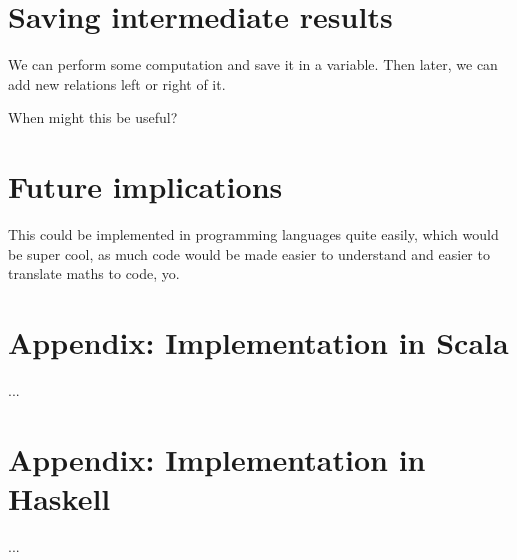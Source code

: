 \documentclass{article}
\begin{document}
\section{Saving intermediate results}
We can perform some computation and save it in a variable. Then later, we can add new relations left or right of it.

When might this be useful?

\section{Future implications}
This could be implemented in programming languages quite easily, which would be super cool, as much code would be made easier to understand and easier to translate maths to code, yo.

\pagebreak
\appendix
\section{Appendix: Implementation in Scala}
...

\section{Appendix: Implementation in Haskell}
...
\end{document}
